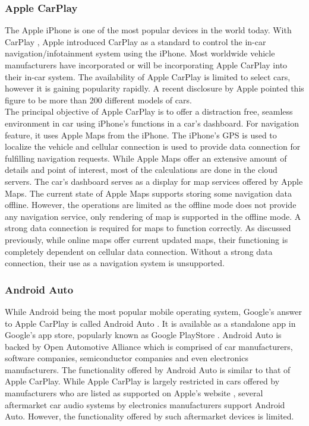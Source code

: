 \subsubsection{Apple CarPlay}
The Apple iPhone is one of the most popular devices in the world today. With CarPlay \cite{AppleCarPlay}, Apple introduced CarPlay as a standard to control the in-car navigation/infotainment system using the iPhone. Most worldwide vehicle manufacturers have incorporated or will be incorporating Apple CarPlay into their in-car system. The availability of Apple CarPlay is limited to select cars, however it is gaining popularity rapidly. A recent disclosure by Apple \cite{Carplaymodels} pointed this figure to be more than 200 different models of cars. \\

The principal objective of Apple CarPlay is to offer a distraction free, seamless environment in car using iPhone's functions in a car's dashboard. For navigation feature, it uses Apple Maps \cite{AppleMaps} from the iPhone. The iPhone's GPS is used to localize the vehicle and cellular connection is used to provide data connection for fulfilling navigation requests. While Apple Maps offer an extensive amount of details and point of interest, most of the calculations are done in the cloud servers. The car's dashboard serves as a display for map services offered by Apple Maps. The current state of Apple Maps supports storing some navigation data offline. However, the operations are limited as the offline mode does not provide any navigation service, only rendering of map is supported in the offline mode. A strong data connection is required for maps to function correctly. As discussed previously, while online maps offer current updated maps, their functioning is completely dependent on cellular data connection. Without a strong data connection, their use as a navigation system is unsupported. 

\subsubsection{Android Auto}
While Android being the most popular mobile operating system, Google's answer to Apple CarPlay is called Android Auto \cite{AndroidAuto}. It is available as a standalone app in Google's app store, popularly known as Google PlayStore \cite{playstore}. Android Auto is backed by Open Automotive Alliance \cite{oaa} which is comprised of car manufacturers, software companies, semiconductor companies and even electronics manufacturers. The functionality offered by Android Auto is similar to that of Apple CarPlay. While Apple CarPlay is largely restricted in cars offered by manufacturers who are listed as supported on Apple's website \cite{Carplaymodels}, several aftermarket car audio systems by electronics manufacturers support Android Auto. However, the functionality offered by such aftermarket devices is limited. \\

